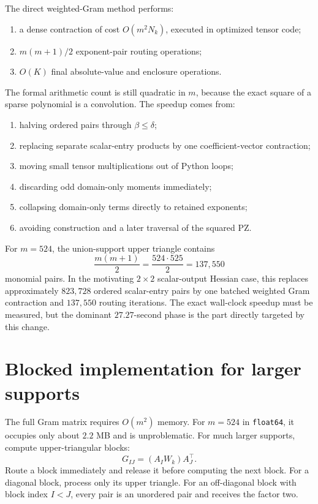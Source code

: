 \documentclass[11pt]{article}
\begin{document}
The direct weighted-Gram method performs:
\begin{enumerate}[label=\arabic*.]
    \item a dense contraction of cost \(O(m^2N_k)\), executed in optimized
    tensor code;
    \item \(m(m+1)/2\) exponent-pair routing operations;
    \item \(O(K)\) final absolute-value and enclosure operations.
\end{enumerate}
The formal arithmetic count is still quadratic in \(m\), because the exact
square of a sparse polynomial is a convolution.  The speedup comes from:
\begin{enumerate}[label=\arabic*.]
    \item halving ordered pairs through \(\beta\leq\delta\);
    \item replacing separate scalar-entry products by one coefficient-vector
    contraction;
    \item moving small tensor multiplications out of Python loops;
    \item discarding odd domain-only moments immediately;
    \item collapsing domain-only terms directly to retained exponents;
    \item avoiding construction and a later traversal of the squared PZ.
\end{enumerate}

For \(m=524\), the union-support upper triangle contains
\[
    \frac{m(m+1)}{2}
    =
    \frac{524\cdot525}{2}
    =
    137{,}550
\]
monomial pairs.  In the motivating \(2\times2\) scalar-output Hessian case,
this replaces approximately \(823{,}728\) ordered scalar-entry pairs by one
batched weighted Gram contraction and \(137{,}550\) routing iterations.
The exact wall-clock speedup must be measured, but the dominant
\(27.27\)-second phase is the part directly targeted by this change.

\section{Blocked implementation for larger supports}
\label{sec:blocked}

The full Gram matrix requires \(O(m^2)\) memory.  For \(m=524\) in
\texttt{float64}, it occupies only about \(2.2\) MB and is unproblematic.
For much larger supports, compute upper-triangular blocks:
\[
    G_{IJ}=(A_IW_k)A_J^\top.
\]
Route a block immediately and release it before computing the next block.
For a diagonal block, process only its upper triangle.  For an off-diagonal
block with block index \(I<J\), every pair is an unordered pair and receives
the factor two.
\end{document}
